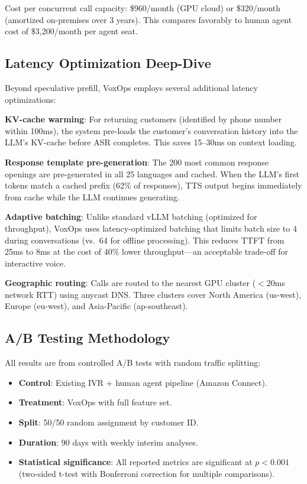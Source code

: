 \documentclass[conference,10pt]{IEEEtran}
\begin{document}
Cost per concurrent call capacity: \$960/month (GPU cloud) or \$320/month (amortized on-premises over 3 years). This compares favorably to human agent cost of \$3,200/month per agent seat.

\subsection{Latency Optimization Deep-Dive}

Beyond speculative prefill, VoxOps employs several additional latency optimizations:

\textbf{KV-cache warming}: For returning customers (identified by phone number within 100ms), the system pre-loads the customer's conversation history into the LLM's KV-cache before ASR completes. This saves 15--30ms on context loading.

\textbf{Response template pre-generation}: The 200 most common response openings are pre-generated in all 25 languages and cached. When the LLM's first tokens match a cached prefix (62\% of responses), TTS output begins immediately from cache while the LLM continues generating.

\textbf{Adaptive batching}: Unlike standard vLLM batching (optimized for throughput), VoxOps uses latency-optimized batching that limits batch size to 4 during conversations (vs.\ 64 for offline processing). This reduces TTFT from 25ms to 8ms at the cost of 40\% lower throughput---an acceptable trade-off for interactive voice.

\textbf{Geographic routing}: Calls are routed to the nearest GPU cluster ($<$20ms network RTT) using anycast DNS. Three clusters cover North America (us-west), Europe (eu-west), and Asia-Pacific (ap-southeast).

\subsection{A/B Testing Methodology}

All results are from controlled A/B tests with random traffic splitting:
\begin{itemize}
\item \textbf{Control}: Existing IVR + human agent pipeline (Amazon Connect).
\item \textbf{Treatment}: VoxOps with full feature set.
\item \textbf{Split}: 50/50 random assignment by customer ID.
\item \textbf{Duration}: 90 days with weekly interim analyses.
\item \textbf{Statistical significance}: All reported metrics are significant at $p < 0.001$ (two-sided t-test with Bonferroni correction for multiple comparisons).
\end{itemize}
\end{document}
